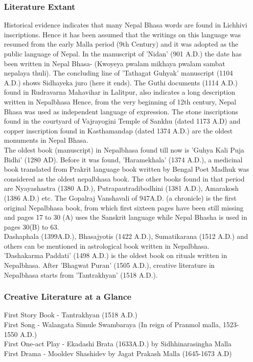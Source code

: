 \documentclass[a4paper,13pt, margin=0.9in]{article}
\begin{document}
\begin{flushleft}
	\subsubsection{Literature Extant}
	Historical evidence indicates that many Nepal Bhasa words are found in Lichhivi inscriptions. Hence it has been assumed that the writings on this language was resumed from the early Malla period (9th Century) and it was adopted as the public language of Nepal. In the manuscript of 'Nidan' (901 A.D.) the date has been written in Nepal Bhasa- (Kwoyeya pwalam mikhaya pwalam sambat nepalaya thuli). The concluding line of 'Tathagat Guhyak' manuscript (1104 A.D.) shows Sidhayeka juro (here it ends). The Guthi documents (1114 A.D.) found in Rudravarna Mahavihar in Lalitpur, also indicates a long description written in Nepalbhasa Hence, from the very beginning of 12th century, Nepal Bhasa was used as independent language of expression. The stone inscriptions found in the courtyard of Vajrayogini Temple of Sankhu (dated 1173 A.D) and copper inscription found in Kasthamandap (dated 1374 A.D.) are the oldest monuments in Nepal Bhasa. \\

	The oldest book (manuscript) in Nepalbhasa found till now is 'Guhya Kali Puja Bidhi' (1280 AD). Before it was found, 'Haramekhala' (1374 A.D.), a medicinal book translated from Prakrit language book written by Bengal Poet Madhuk was considered as the oldest nepalbhasa book. The other books found in that period are Nyayashastra (1380 A.D.), Putrapautradibodhini (1381 A.D.), Amarakosh (1386 A.D.) etc. The Gopalraj Vanshavali of 947A.D. (a chronicle) is the first original Nepalbhasa book, from which first sixteen pages have been still missing and pages 17 to 30 (A) uses the Sanskrit language while Nepal Bhasha is used in pages 30(B) to 63. \\

	Dashaphala (1399A.D.), Bhasajyotis (1422 A.D.), Sumatikarana (1512 A.D.) and others can be mentioned in astrological book written in Nepalbhasa. 'Dashakarma Paddati' (1498 A.D.) is the oldest book on rituals written in Nepalbhasa. After 'Bhagwat Puran' (1505 A.D.), creative literature in Nepalbhasa starts from 'Tantrakhyan' (1518 A.D.).\\

	\subsubsection{Creative Literature at a Glance}
	First Story Book - Tantrakhyan (1518 A.D.)\\
	First Song - Walangata Simule Swambaraya (In reign of Pranmol malla, 1523-1550 A.D.)\\
	First One-act Play - Ekadashi Brata (1633A.D.) by Sidhhinarasingha Malla\\
	First Drama - Mooldev Shashidev by Jagat Prakash Malla (1645-1673 A.D)\\



\end{flushleft}
\end{document}
